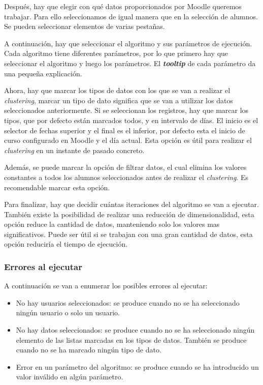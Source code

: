 Después, hay que elegir con qué datos proporcionados por Moodle queremos trabajar. Para ello seleccionamos de igual manera que en la selección de alumnos. Se pueden seleccionar elementos de varias pestañas.

A continuación, hay que seleccionar el algoritmo y sus parámetros de ejecución. Cada algoritmo tiene diferentes parámetros, por lo que primero hay que seleccionar el algoritmo y luego los parámetros.
El \textbf{\emph{tooltip}} de cada parámetro da una pequeña explicación. 

Ahora, hay que marcar los tipos de datos con los que se van a realizar el \emph{clustering}, marcar un tipo de dato significa que se van a utilizar los datos seleccionados anteriormente. Si se seleccionan los registros, hay que marcar los tipos, que por defecto están marcados todos, y en intervalo de días. El inicio es el selector de fechas superior y el final es el inferior, por defecto esta el inicio de curso configurado en Moodle y el día actual. Esta opción es útil para realizar el \emph{clustering} en un instante de pasado concreto.

Además, se puede marcar la opción de filtrar datos, el cual elimina los valores constantes a todos los alumnos seleccionados antes de realizar el \emph{clustering}. Es recomendable marcar esta opción.

Para finalizar, hay que decidir cuántas iteraciones del algoritmo se van a ejecutar. También existe la posibilidad de realizar una reducción de dimensionalidad, esta opción reduce la cantidad de datos, manteniendo solo los valores mas significativos. Puede ser útil si se trabajan con una gran cantidad de datos, esta opción reduciría el tiempo de ejecución.

\subsubsection{Errores al ejecutar}
A continuación se van a enumerar los posibles errores al ejecutar:
\begin{itemize}
	\item No hay usuarios seleccionados: se produce cuando no se ha seleccionado ningún usuario o solo un usuario.
	\item No hay datos seleccionados: se produce cuando no se ha seleccionado ningún elemento de las listas marcadas en los tipos de datos. También se produce cuando no se ha marcado ningún tipo de dato.
	\item Error en un parámetro del algoritmo: se produce cuando se ha introducido un valor inválido en algún parámetro.
\end{itemize}

